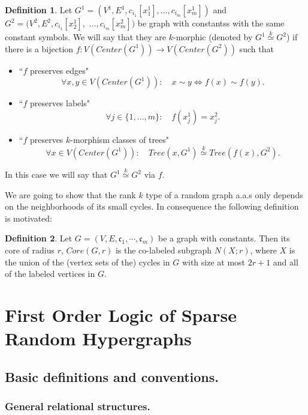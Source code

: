 \documentclass[11pt,notitlepage]{report}
\theoremstyle{definition}
\newtheorem{definition}{Definition}[chapter]
\newcommand{\clist}{\mathfrak{c}_{1}, \cdots, \mathfrak{c}_m}
\newcommand{\morph}[1]{\stackrel{#1}{\simeq}}
\begin{document}
\begin{definition}
	Let $G^1=(V^1,E^1,c_{i_1}[x^1_1],\dots, c_{i_m}[x_m^1])$ and  $G^2=(V^2,E^2,c_{i_1}[x^1_2],$ 
	$\dots, c_{i_m}[x_m^2])$ be graph with constantss with the same constant symbols. 
	We will say that they are $k$-morphic (denoted by $G^1 \morph{k}G^2$) if there is
	a bijection $f: V(Center(G^1))\rightarrow V(Center(G^2))$ such that
	\begin{itemize}
		\item ``$f$ preserves edges"
		\[\forall x,y\in V(Center(G^1)): \quad  x\sim y \iff f(x)\sim f(y). \]
		\item ``$f$ preserves labels"
		\[\forall j\in \{1,\dots,m\}: \quad f(x^1_j) = x^2_j.\]
		\item ``$f$ preserves $k$-morphism classes of trees"
		\[\forall x\in V(Center(G^1)): \quad  Tree(x,G^1)\morph{k} Tree(f(x),G^2).\]
	\end{itemize}
	In this case we will say that $G^1 \morph{k} G^2$ via $f$. 	
\end{definition}

We are going to show that the rank $k$ type of a random graph a.a.s only 
depends on the neighborhoods of its small cycles. In consequence the following definition
is motivated:

\begin{definition} 
	Let $G=(V,E,\clist)$ be a graph with constants. Then its core of radius $r$, $Core(G,r)$
	is the co-labeled subgraph $N(X;r)$, where $X$ is the union of the (vertex sets of the)
	cycles in $G$ with size at most $2r+1$ and all of the labeled vertices in $G$. 
\end{definition}



\chapter{First Order Logic of Sparse Random Hypergraphs}

\section{Basic definitions and conventions.}

\subsection{General relational structures.}
\end{document}

